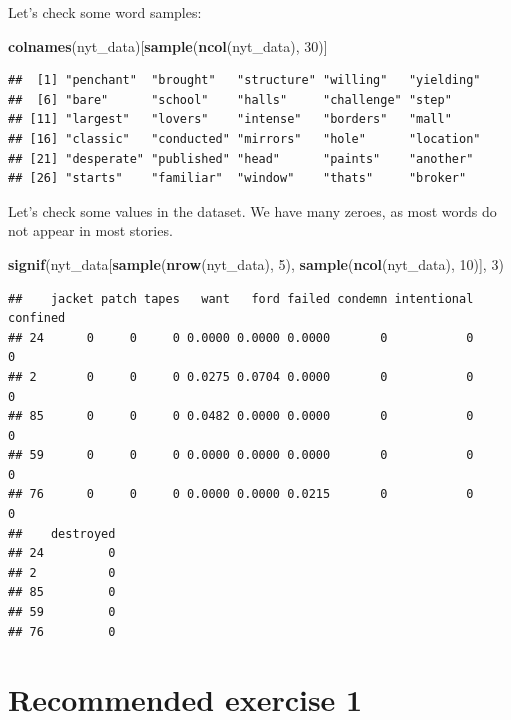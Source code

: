 \documentclass[]{article}
\newenvironment{Shaded}{\begin{snugshade}}{\end{snugshade}}
\newcommand{\DecValTok}[1]{\textcolor[rgb]{0.00,0.00,0.81}{#1}}
\newcommand{\KeywordTok}[1]{\textcolor[rgb]{0.13,0.29,0.53}{\textbf{#1}}}
\newcommand{\NormalTok}[1]{#1}
\begin{document}
Let's check some word samples:

\begin{Shaded}
\begin{Highlighting}[]
\KeywordTok{colnames}\NormalTok{(nyt_data)[}\KeywordTok{sample}\NormalTok{(}\KeywordTok{ncol}\NormalTok{(nyt_data), }\DecValTok{30}\NormalTok{)]}
\end{Highlighting}
\end{Shaded}

\begin{verbatim}
##  [1] "penchant"  "brought"   "structure" "willing"   "yielding" 
##  [6] "bare"      "school"    "halls"     "challenge" "step"     
## [11] "largest"   "lovers"    "intense"   "borders"   "mall"     
## [16] "classic"   "conducted" "mirrors"   "hole"      "location" 
## [21] "desperate" "published" "head"      "paints"    "another"  
## [26] "starts"    "familiar"  "window"    "thats"     "broker"
\end{verbatim}

Let's check some values in the dataset. We have many zeroes, as most
words do not appear in most stories.

\begin{Shaded}
\begin{Highlighting}[]
\KeywordTok{signif}\NormalTok{(nyt_data[}\KeywordTok{sample}\NormalTok{(}\KeywordTok{nrow}\NormalTok{(nyt_data), }\DecValTok{5}\NormalTok{), }\KeywordTok{sample}\NormalTok{(}\KeywordTok{ncol}\NormalTok{(nyt_data), }\DecValTok{10}\NormalTok{)], }\DecValTok{3}\NormalTok{)}
\end{Highlighting}
\end{Shaded}

\begin{verbatim}
##    jacket patch tapes   want   ford failed condemn intentional confined
## 24      0     0     0 0.0000 0.0000 0.0000       0           0        0
## 2       0     0     0 0.0275 0.0704 0.0000       0           0        0
## 85      0     0     0 0.0482 0.0000 0.0000       0           0        0
## 59      0     0     0 0.0000 0.0000 0.0000       0           0        0
## 76      0     0     0 0.0000 0.0000 0.0215       0           0        0
##    destroyed
## 24         0
## 2          0
## 85         0
## 59         0
## 76         0
\end{verbatim}

\hypertarget{recommended-exercise-1}{%
\section{Recommended exercise 1}\label{recommended-exercise-1}}
\end{document}
